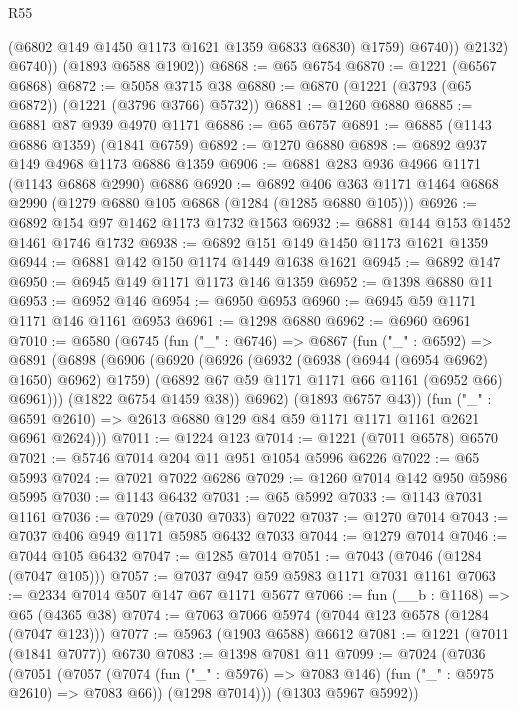 \begin{lexlean}{R55}
\begin{coremodule}
                  (@6802 @149 @1450 @1173 @1621 @1359 @6833 @6830)
                  @1759)
                @6740))
            @2132)
          @6740))
      (@1893 @6588 @1902))
@6868 := @65 @6754
@6870 := @1221 (@6567 @6868)
@6872 := @5058 @3715 @38
@6880 := @6870 (@1221 (@3793 (@65 @6872)) (@1221 (@3796 @3766) @5732))
@6881 := @1260 @6880
@6885 := @6881 @87 @939 @4970 @1171
@6886 := @65 @6757
@6891 := @6885 (@1143 @6886 @1359) (@1841 @6759)
@6892 := @1270 @6880
@6898 := @6892 @937 @149 @4968 @1173 @6886 @1359
@6906 := @6881 @283 @936 @4966 @1171 (@1143 @6868 @2990) @6886
@6920 := @6892 @406 @363 @1171 @1464 @6868 @2990 (@1279 @6880 @105 @6868 (@1284 (@1285 @6880 @105)))
@6926 := @6892 @154 @97 @1462 @1173 @1732 @1563
@6932 := @6881 @144 @153 @1452 @1461 @1746 @1732
@6938 := @6892 @151 @149 @1450 @1173 @1621 @1359
@6944 := @6881 @142 @150 @1174 @1449 @1638 @1621
@6945 := @6892 @147
@6950 := @6945 @149 @1171 @1173 @146 @1359
@6952 := @1398 @6880 @11
@6953 := @6952 @146
@6954 := @6950 @6953
@6960 := @6945 @59 @1171 @1171 @146 @1161 @6953
@6961 := @1298 @6880
@6962 := @6960 @6961
@7010 := @6580
    (@6745
      (fun ("_" : @6746) =>
      @6867
        (fun ("_" : @6592) =>
        @6891
          (@6898
            (@6906
              (@6920
                (@6926
                  (@6932 (@6938 (@6944 (@6954 @6962) @1650) @6962) @1759)
                  (@6892 @67 @59 @1171 @1171 @66 @1161 (@6952 @66) @6961)))
              (@1822 @6754 @1459 @38))
            @6962)
          (@1893 @6757 @43))
        (fun ("_" : @6591 @2610) => @2613 @6880 @129 @84 @59 @1171 @1171 @1161 @2621 @6961 @2624)))
@7011 := @1224 @123
@7014 := @1221 (@7011 @6578) @6570
@7021 := @5746 @7014 @204 @11 @951 @1054 @5996 @6226
@7022 := @65 @5993
@7024 := @7021 @7022 @6286
@7029 := @1260 @7014 @142 @950 @5986 @5995
@7030 := @1143 @6432
@7031 := @65 @5992
@7033 := @1143 @7031 @1161
@7036 := @7029 (@7030 @7033) @7022
@7037 := @1270 @7014
@7043 := @7037 @406 @949 @1171 @5985 @6432 @7033
@7044 := @1279 @7014
@7046 := @7044 @105 @6432
@7047 := @1285 @7014
@7051 := @7043 (@7046 (@1284 (@7047 @105)))
@7057 := @7037 @947 @59 @5983 @1171 @7031 @1161
@7063 := @2334 @7014 @507 @147 @67 @1171 @5677
@7066 := fun (__b : @1168) => @65 (@4365 @38)
@7074 := @7063 @7066 @5974 (@7044 @123 @6578 (@1284 (@7047 @123)))
@7077 := @5963 (@1903 @6588) @6612
@7081 := @1221 (@7011 (@1841 @7077)) @6730
@7083 := @1398 @7081 @11
@7099 := @7024
    (@7036
      (@7051
        (@7057
          (@7074 (fun ("_" : @5976) => @7083 @146) (fun ("_" : @5975 @2610) => @7083 @66))
          (@1298 @7014)))
      (@1303 @5967 @5992))

\end{coremodule}
\end{lexlean}
